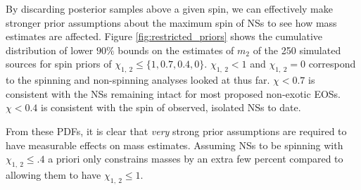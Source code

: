 By discarding posterior samples above a given spin, we can effectively make stronger prior assumptions about the maximum spin of NSs to see how mass estimates are affected.  Figure \ref{fig:restricted_priors} shows the cumulative distribution of lower $90\%$ bounds on the estimates of $m_2$ of the 250 simulated sources for spin priors of $\chi_{1,~2} \leq \{1, 0.7, 0.4, 0\}$.  $\chi_{1,~2}<1$ and $\chi_{1,~2}=0$ correspond to the spinning and non-spinning analyses looked at thus far.  $\chi<0.7$ is consistent with the NSs remaining intact for most proposed non-exotic EOSs.  $\chi<0.4$ is consistent with the spin of observed, isolated NSs to date.

From these PDFs, it is clear that \emph{very} strong prior assumptions are required to have measurable effects on mass estimates. Assuming NSs to be spinning with $\chi_{1,~2}\leq .4$ a priori only constrains masses by an extra few percent compared to allowing them to have $\chi_{1,~2} \leq 1$.